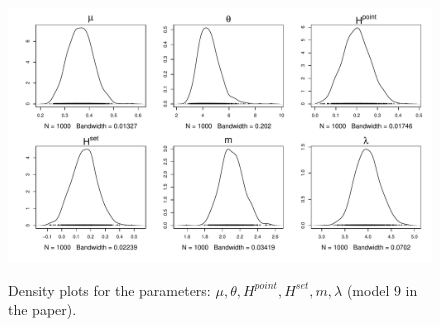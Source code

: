 \documentclass{statsoc}
\begin{document}
\begin{figure}
\centering
\includegraphics[scale=0.6]{Traceplots/Densplots.pdf}\\
\caption{Density plots for the parameters: $\mu, \theta, H^{point}, H^{set}, m, \lambda$  (model 9 in the paper).}
\label{figS7}
\end{figure}
\end{document}
